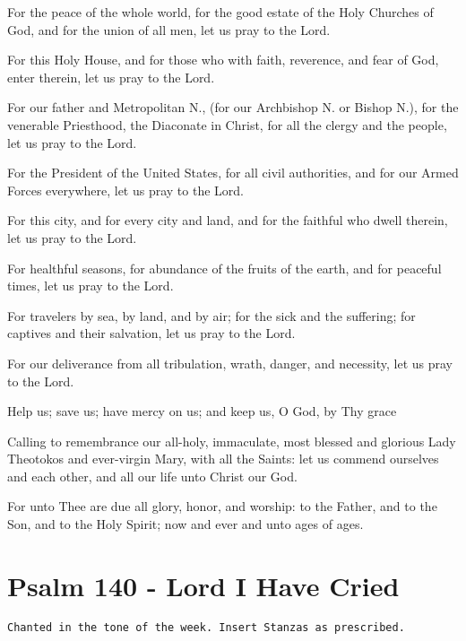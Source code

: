 \documentclass[twoside, letterpaper, 12pt]{report}
\newcommand{\instruction}[1]{%
  \texttt{\scriptsize{#1}}%
}
\newcommand{\centeredsection}[1]{%
  \needspace{10\baselineskip}%
  \section*{\centering{}#1}%
}
\begin{document}
\begin{deacon}
\item For the peace of the whole world, for the good estate of the Holy Churches of God,
    and for the union of all men, let us pray to the Lord.
\item For this Holy House, and for those who with faith, reverence, and fear of God,
    enter therein, let us pray to the Lord.
\item For our father and Metropolitan N., (for our Archbishop N. or Bishop N.),
    for the venerable Priesthood, the Diaconate in Christ,
    for all the clergy and the people, let us pray to the Lord.
\item  For the President of the United States, for all civil authorities,
    and for our Armed Forces everywhere, let us pray to the Lord.
\item For this city, and for every city and land, and for the faithful who dwell
    therein, let us pray to the Lord.
\item For healthful seasons, for abundance of the fruits of the earth,
    and for peaceful times, let us pray to the Lord.
\item For travelers by sea, by land, and by air; for the sick and the suffering;
    for captives and their salvation, let us pray to the Lord.
\item For our deliverance from all tribulation, wrath, danger, and necessity,
    let us pray to the Lord.
\item  Help us; save us; have mercy on us; and keep us, O God, by Thy grace
\item Calling to remembrance our all-holy, immaculate, most blessed and glorious Lady
    Theotokos and ever-virgin Mary, with all the Saints: let us commend ourselves and
    each other, and all our life unto Christ our God.
\end{deacon}


\begin{priest}
\item For unto Thee are due all glory, honor, and worship: to the Father,
    and to the Son, and to the Holy Spirit; now and ever and unto ages of ages.
\end{priest}


\centeredsection{Psalm 140 - Lord I Have Cried}
\instruction{Chanted in the tone of the week. Insert Stanzas as prescribed.}
\end{document}
